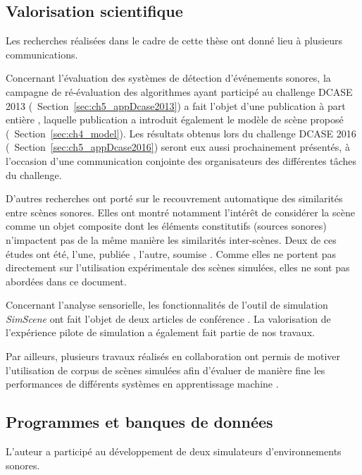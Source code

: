 \subsection{Valorisation scientifique}

Les recherches réalisées dans le cadre de cette thèse ont donné lieu à plusieurs communications.

Concernant l'évaluation des systèmes de détection d'événements sonores, la campagne de ré-évaluation des algorithmes ayant participé au challenge DCASE 2013 (\cf~Section~\ref{sec:ch5_appDcase2013}) a fait l'objet d'une publication à part entière \citep{lafay2016morphological}, laquelle publication a introduit également le modèle de scène proposé (\cf~Section~\ref{sec:ch4_model}). Les résultats obtenus lors du challenge DCASE 2016 (\cf~Section~\ref{sec:ch5_appDcase2016}) seront eux aussi prochainement présentés, à l'occasion d'une communication conjointe des organisateurs des différentes tâches du challenge.

D'autres recherches ont porté sur le recouvrement automatique des similarités entre scènes sonores. Elles ont montré notamment l'intérêt de considérer la scène comme un objet composite dont les éléments constitutifs (sources sonores) n'impactent pas de la même manière les similarités inter-scènes. Deux de ces études ont été, l'une, publiée \citep{lagrange2015bag}, l'autre, soumise \citep{Lostenlen2016ScatteringObjet}. Comme elles ne portent pas directement sur l'utilisation expérimentale des scènes simulées, elles ne sont pas abordées dans ce document.

Concernant l'analyse sensorielle, les fonctionnalités de l'outil de simulation \emph{SimScene} ont fait l'objet de deux articles de conférence  \citep{rossignol2015simscene,lafay2016JAES}. La valorisation de l'expérience pilote de simulation \citep{lafay2014new} a également fait partie de nos travaux.

Par ailleurs, plusieurs travaux réalisés en collaboration ont permis de motiver l'utilisation de corpus de scènes simulées afin d'évaluer de manière fine les performances de différents systèmes en apprentissage machine \citep{benetos2016detectionLDC,rossignol2015alternate,benetos2016detection}.

\subsection{Programmes et banques de données}

L'auteur a participé au développement de deux simulateurs d'environnements sonores.

